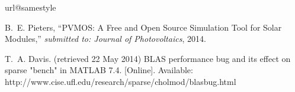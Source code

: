 \documentclass[noshowpacs,preprintnumbers,amsmath,amssymb, letter]{revtex4}
\begin{document}
\begin{thebibliography}{10}
\providecommand{\url}[1]{#1}
\csname url@samestyle\endcsname
\providecommand{\newblock}{\relax}
\providecommand{\bibinfo}[2]{#2}
\providecommand{\BIBentrySTDinterwordspacing}{\spaceskip=0pt\relax}
\providecommand{\BIBentryALTinterwordstretchfactor}{4}
\providecommand{\BIBentryALTinterwordspacing}{\spaceskip=\fontdimen2\font plus
\BIBentryALTinterwordstretchfactor\fontdimen3\font minus
  \fontdimen4\font\relax}
\providecommand{\BIBforeignlanguage}[2]{{%
\expandafter\ifx\csname l@#1\endcsname\relax
\typeout{** WARNING: IEEEtran.bst: No hyphenation pattern has been}%
\typeout{** loaded for the language `#1'. Using the pattern for}%
\typeout{** the default language instead.}%
\else
\language=\csname l@#1\endcsname
\fi
#2}}
\providecommand{\BIBdecl}{\relax}
\BIBdecl


B.~E. Pieters, ``{PVMOS: A Free and Open Source Simulation Tool for Solar Modules},'' \emph{submitted to: Journal of Photovoltaics}, 2014.

T.~A. Davis. (retrieved 22 May 2014) {BLAS performance bug and its effect on
  sparse "bench" in MATLAB 7.4}. [Online]. Available:
  \url{http://www.cise.ufl.edu/research/sparse/cholmod/blasbug.html}
\end{thebibliography}
\end{document}
